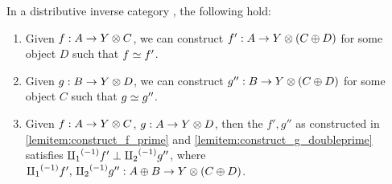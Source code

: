 \begin{lemma}\label{lem:maps_from_inverse_sums_have_disjoint_equivalences}
  In a distributive inverse category \X, the following hold:
  \begin{enumerate}[{(}i{)}]
    \item Given $f : A \to Y\otimes C$, we can construct $f' : A \to Y \otimes (C\oplus D)$ for some object $D$ such
      that $f \overset{\scriptscriptstyle }{\simeq} f'$.\label{lemitem:construct_f_prime}
    \item Given $g : B \to Y\otimes D$, we can construct $g'' : B \to Y \otimes (C\oplus D)$ for some object $C$ such
      that $g \overset{\scriptscriptstyle }{\simeq} g''$.\label{lemitem:construct_g_doubleprime}
    \item Given $f : A \to Y \otimes C$, $g : A\to Y \otimes D$, then the $f', g''$ as constructed in
      \ref{lemitem:construct_f_prime} and \ref{lemitem:construct_g_doubleprime} satisfies ${\amalg_{1}}^{(-1)} f'
      \perp {\amalg_{2}}^{(-1)} g''$, where ${\amalg_{1}}^{(-1)} f',\,{\amalg_{2}}^{(-1)} g'': A\oplus B \to Y\otimes(C\oplus D)$.
  \end{enumerate}
\end{lemma}
